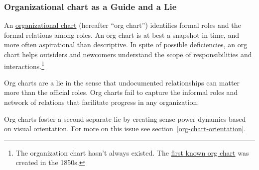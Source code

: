 \subsubsection*{Organizational chart as a Guide and a Lie}

An \href{https://en.wikipedia.org/wiki/Organizational_chart}{organizational chart} (hereafter ``org chart'') identifies formal roles and the formal relations among roles. An org chart is at best a snapshot in time, and more often aspirational than descriptive. In spite of possible deficiencies, an org chart helps outsiders and newcomers understand the scope of responsibilities and interactions.\footnote{The organization chart hasn't always existed. The \href{https://en.wikipedia.org/wiki/George_Holt_Henshaw\#First_organization_chart}{first known org chart} was created in the 1850s.}

Org charts are a lie in the sense that undocumented relationships can matter more than the official roles. Org charts fail to capture the informal roles and network of relations that facilitate progress in any organization. 

Org charts foster a second separate lie by creating sense power dynamics based on visual orientation. For more on this issue see section~\ref{org-chart-orientation}.
